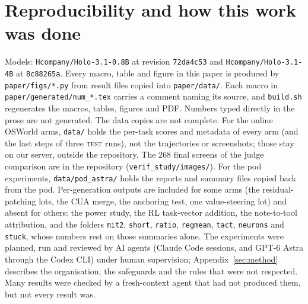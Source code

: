 \section{Reproducibility and how this work was done}
\label{sec:repro}
Models: \texttt{Hcompany/Holo-3.1-0.8B} at revision \texttt{72da4c53} and \texttt{Hcompany/Holo-3.1-4B} at \texttt{8c88265a}. %
Every macro, table and figure in this paper is produced by \texttt{paper/figs/*.py} from result files copied into \texttt{paper/data/}. Each macro in \texttt{paper/generated/num\_*.tex} carries a comment naming its source, and \texttt{build.sh} regenerates the macros, tables, figures and PDF. Numbers typed directly in the prose are not generated. %
The data copies are not complete. For the online OSWorld arms, \texttt{data/} holds the per-task scores and metadata of every arm (and the last steps of three \textsc{test} runs), not the trajectories or screenshots; those stay on our server, outside the repository. The 268 final screens of the judge comparison are in the repository (\texttt{verif\_study/images/}). For the pod experiments, \texttt{data/pod\_astra/} holds the reports and summary files copied back from the pod. Per-generation outputs are included for some arms (the residual-patching lots, the CUA merge, the anchoring test, one value-steering lot) and absent for others: the power study, the RL task-vector addition, the note-to-tool attribution, and the folders \texttt{mit2}, \texttt{short}, \texttt{ratio}, \texttt{regmean}, \texttt{tact}, \texttt{neurons} and \texttt{stuck}, whose numbers rest on those summaries alone. %
The experiments were planned, run and reviewed by AI agents (Claude Code sessions, and GPT-6 Astra through the Codex CLI) under human supervision; Appendix~\ref{sec:method} describes the organisation, the safeguards and the rules that were not respected. Many results were checked by a fresh-context agent that had not produced them, but not every result was. %
